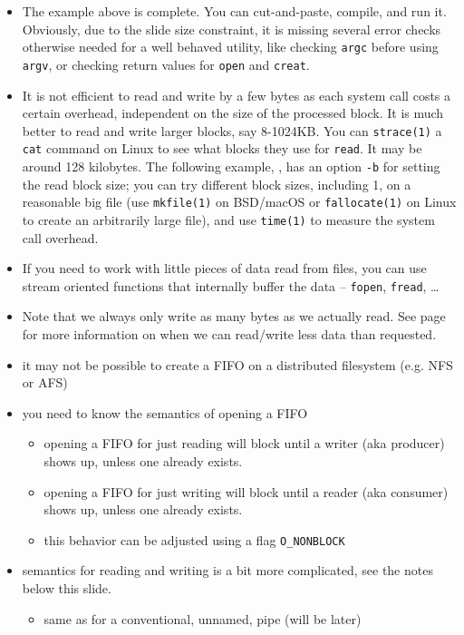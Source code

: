 \begin{itemize}
\item The example above is complete.  You can cut-and-paste, compile, and run
it.  Obviously, due to the slide size constraint, it is missing several error
checks otherwise needed for a well behaved utility, like checking \texttt{argc}
before using \texttt{argv}, or checking return values for \texttt{open} and
\texttt{creat}.
\item It is not efficient to read and write by a few bytes as each system call
costs a certain overhead, independent on the size of the processed block.  It is
much better to read and write larger blocks, say 8-1024KB.  You can
\texttt{strace(1)} a \texttt{cat} command on Linux to see what blocks they use
for \texttt{read}.  It may be around 128 kilobytes.  The following example,
, has an option \texttt{-b} for setting the read block size;
you can try different block sizes, including 1, on a reasonable big file (use
\texttt{mkfile(1)} on BSD/macOS or \texttt{fallocate(1)} on Linux to create an
arbitrarily large file), and use \texttt{time(1)} to measure the system call
overhead.
\item If you need to work with little pieces of data read from files, you can
use stream oriented functions that internally buffer the data -- \texttt{fopen},
\texttt{fread}, \dots
\item Note that we always only write as many bytes as we actually read.  See
page \pageref{READCALL} for more information on when we can read/write less data
than requested.
\end{itemize}

\begin{slide}

\begin{itemize}
\item it may not be possible to create a FIFO on a distributed filesystem (e.g.
NFS or AFS)
\item you need to know the semantics of opening a FIFO
  \begin{itemize}
  \item opening a FIFO for just reading will block until a writer (aka producer)
  shows up, unless one already exists.
  \item opening a FIFO for just writing will block until a reader (aka consumer)
  shows up, unless one already exists.
  \item this behavior can be adjusted using a flag \texttt{O\_NONBLOCK}
  \end{itemize}
\item semantics for reading and writing is a bit more complicated, see
the notes below this slide.
  \begin{itemize}
  \item same as for a conventional, unnamed, pipe (will be later)
  \end{itemize}
\end{itemize}
\end{slide}

